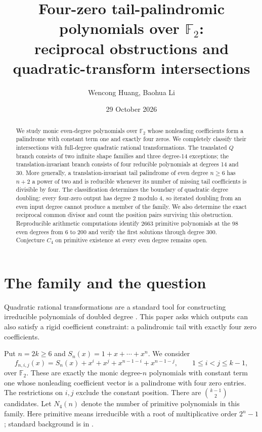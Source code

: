 \documentclass[11pt]{article}
\title{\Large Four-zero tail-palindromic polynomials over $\mathbb F_2$:\\
reciprocal obstructions and quadratic-transform intersections}
\author{Wencong Huang, Baohua Li}
\date{29 October 2026}
\theoremstyle{definition}
\theoremstyle{remark}
\begin{document}
\maketitle
\begin{abstract}
We study monic even-degree polynomials over $\mathbb F_2$ whose nonleading coefficients form a palindrome with constant term one and exactly four zeros. We completely classify their intersections with full-degree quadratic rational transformations. The translated $Q$ branch consists of two infinite shape families and three degree-14 exceptions; the translation-invariant branch consists of four reducible polynomials at degrees 14 and 30. More generally, a translation-invariant tail palindrome of even degree $n\ge6$ has $n+2$ a power of two and is reducible whenever its number of missing tail coefficients is divisible by four. The classification determines the boundary of quadratic degree doubling: every four-zero output has degree $2$ modulo $4$, so iterated doubling from an even input degree cannot produce a member of the family. We also determine the exact reciprocal common divisor and count the position pairs surviving this obstruction. Reproducible arithmetic computations identify 2663 primitive polynomials at the 98 even degrees from 6 to 200 and verify the first solutions through degree 300. Conjecture $C_4$ on primitive existence at every even degree remains open.
\end{abstract}

\section{The family and the question}\label{sec:intro}
Quadratic rational transformations are a standard tool for constructing
irreducible polynomials of doubled degree \cite{MP17}. This paper asks
which outputs can also satisfy a rigid coefficient constraint: a
palindromic tail with exactly four zero coefficients.

Put $n=2k\ge6$ and $S_n(x)=1+x+\cdots+x^n$. We consider
\begin{equation}\label{eq:candidate}
 f_{n,i,j}(x)=S_n(x)+x^i+x^j+x^{n-1-i}+x^{n-1-j},
 \qquad 1\le i<j\le k-1,
\end{equation}
over $\mathbb F_2$. These are exactly the monic degree-$n$ polynomials
with constant term one whose nonleading coefficient vector is a
palindrome with four zero entries. The restrictions on $i,j$ exclude
the constant position. There are $\binom{k-1}{2}$ candidates.
Let $N_4(n)$ denote the number of primitive polynomials in this family.
Here primitive means irreducible with a root of multiplicative order
$2^n-1$; standard background is in \cite{LN}.
\end{document}
